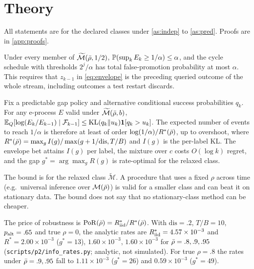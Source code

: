 \section{Theory}\label{sec:theory}

All statements are for the declared classes under \cref{as:indep} to \cref{as:pred}. Proofs are in
\cref{app:proofs}. %

\begin{proposition}\label{prop:validity}
Under every member of $\widetilde{\mathcal M}(\bar\rho,1/2)$, $\mathbb{P}(\sup_k E_k\ge 1/\alpha)\le\alpha$,
and the cycle schedule with thresholds $2^j/\alpha$ has total false-promotion probability at most
$\alpha$. This requires that $z_{k-1}$ in \eqref{eq:envelope} is the preceding queried outcome of the
whole stream, including outcomes a test restart discards.
\end{proposition}

\begin{proposition}\label{prop:rate}
Fix a predictable gap policy and alternative conditional success probabilities $q_k$. For any
e-process $E$ valid under $\widetilde{\mathcal M}(\bar\rho,b)$,
$\mathbb{E}_Q[\log(E_k/E_{k-1})\mid\mathcal{F}_{k-1}]\le \mathrm{KL}(q_k\Vert u_k)\mathbf 1[q_k>u_k]$.
The expected number of events to reach $1/\alpha$ is therefore at least of order
$\log(1/\alpha)/R^*(\bar\rho)$, up to overshoot, where $R^*(\bar\rho)=\max_g I(g)/\max(g+1/\mathrm{dis},T/B)$
and $I(g)$ is the per-label KL. The envelope bet attains $I(g)$ per label, the mixture over $c$ costs
$O(\log k)$ regret, and the gap $g^*=\arg\max_g R(g)$ is rate-optimal for the relaxed class.
\end{proposition}
\begin{remark}[Caveat]\label{rem:caveat}
The bound is for the relaxed class $\widetilde{\mathcal M}$. A procedure that uses a fixed $\rho$ across
time (e.g.\ universal inference over $\mathcal M(\bar\rho)$) is valid for a smaller class and can beat it
on stationary data. The bound does not say that no stationary-class method can be cheaper.
\end{remark}
The price of robustness is $\mathrm{PoR}(\bar\rho)=R^*_{\rm iid}/R^*(\bar\rho)$. With $\mathrm{dis}=.2$,
$T/B=10$, $p_{\rm alt}=.65$ and true $\rho=0$, the analytic rates are $R^*_{\rm iid}=4.57\times10^{-3}$
and $R^*=2.00\times10^{-3}$ ($g^*=13$), $1.60\times10^{-3}$, $1.60\times10^{-3}$ for
$\bar\rho=.8,.9,.95$ (\texttt{scripts/p2/info\_rates.py}; analytic, not simulated). For true $\rho=.8$
the rates under $\bar\rho=.9,.95$ fall to $1.11\times10^{-3}$ ($g^*=26$) and $0.59\times10^{-3}$
($g^*=49$).


